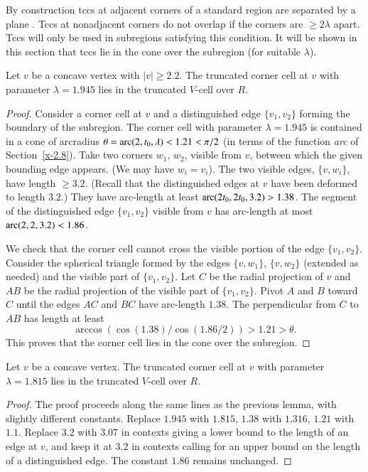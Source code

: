 By construction tccs at adjacent
corners of a standard region are separated by a plane . Tccs at
nonadjacent corners do not overlap if the corners are
$\ge2\lambda$ apart. Tccs will only be used in subregions
satisfying this condition. It will be shown in
this section that tccs lie in the cone over the subregion
(for suitable $\lambda$).

\begin{lemma}
Let $v$ be a concave vertex with $|v|\ge2.2$. The truncated
corner cell at $v$ with parameter $\lambda=1.945$ lies in the truncated
$V$-cell over $R$.
\end{lemma}

\begin{proof}
Consider a  corner cell at $v$ and a distinguished edge $\{v_1,v_2\}$
forming the boundary of the subregion. The corner cell with parameter
$\lambda=1.945$ is contained in a cone of arcradius
    $\theta = \operatorname{arc}(2,t_0,\lambda)< 1.21 <\pi/2$
(in terms of the function {\it arc\/} of Section~\ref{x-2.8}). Take two
corners $w_1$, $w_2$, visible from $v$, between which the given bounding
edge appears. (We may have $w_i=v_i$). The two visible edges, $\{v,w_i\}$,
have length $\ge 3.2$. (Recall that the distinguished edges at $v$ have
been deformed to length $3.2$.) They have arc-length at least
$\operatorname{arc}(2t_0,2t_0,3.2)>1.38$. The segment of the distinguished edge
$\{v_1,v_2\}$ visible from $v$ has arc-length at most
$\operatorname{arc}(2,2,3.2)<1.86$.

We check that the corner cell cannot cross the visible portion of
the edge $\{v_1,v_2\}$. Consider the spherical triangle formed by
the edges $\{v,w_1\}$, $\{v,w_2\}$ (extended as needed) and the
visible part of $\{v_1,v_2\}$. Let $C$ be the radial projection of
$v$ and $AB$ be the radial projection of the visible part of
$\{v_1,v_2\}$. Pivot $A$ and $B$ toward $C$ until the edges $AC$ and
$BC$ have arc-length $1.38$.  The perpendicular from $C$ to $AB$
has length at least
    $$\arccos(\cos(1.38)/\cos(1.86/2))>1.21>\theta.$$
This proves that the corner cell lies in the cone over the subregion.
\end{proof}

\begin{lemma}
Let $v$ be a concave vertex. The truncated corner cell at $v$ with
parameter $\lambda=1.815$ lies in the truncated $V$-cell over $R$.
\end{lemma}

\begin{proof}
The proof proceeds along the same lines as the previous lemma, with
slightly different constants. Replace $1.945$ with $1.815$, $1.38$ with
$1.316$, $1.21$ with $1.1$. Replace $3.2$ with $3.07$ in contexts giving
a lower bound to the length of an edge at $v$, and keep it at $3.2$ in
contexts calling for an upper bound on the length of a distinguished
edge. The constant $1.86$ remains unchanged.
\end{proof}

